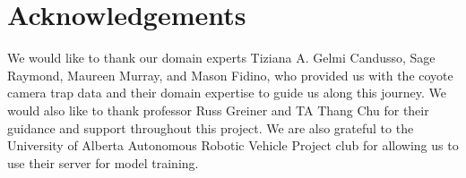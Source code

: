 \documentclass{article}
\begin{document}
\section{Acknowledgements} \label{sec:acknowledgements}
We would like to thank our domain experts Tiziana A. Gelmi Candusso, Sage
Raymond, Maureen Murray, and Mason Fidino, who provided us with the coyote
camera trap data and their domain expertise to guide us along this journey. We
would also like to thank professor Russ Greiner and TA Thang Chu for their
guidance and support throughout this project. We are also grateful to the
University of Alberta Autonomous Robotic Vehicle Project club for allowing us
to use their server for model training.

\clearpage

\small



\end{document}
